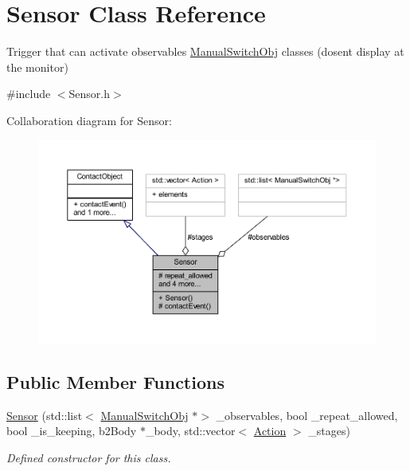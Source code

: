 \hypertarget{class_sensor}{}\section{Sensor Class Reference}
\label{class_sensor}


Trigger that can activate observables \hyperlink{class_manual_switch_obj}{Manual\+Switch\+Obj} classes (dosen\textquotesingle{}t display at the monitor)  




{\ttfamily \#include $<$Sensor.\+h$>$}



Collaboration diagram for Sensor\+:
\nopagebreak
\begin{figure}[H]
\begin{center}
\leavevmode
\includegraphics[width=350pt]{class_sensor__coll__graph}
\end{center}
\end{figure}
\subsection*{Public Member Functions}
\begin{DoxyCompactItemize}
\item 
\hyperlink{class_sensor_a7988853c8a9278171ce8956ccdde63c8}{Sensor} (std\+::list$<$ \hyperlink{class_manual_switch_obj}{Manual\+Switch\+Obj} $\ast$$>$ \+\_\+observables, bool \+\_\+repeat\+\_\+allowed, bool \+\_\+is\+\_\+keeping, b2\+Body $\ast$\+\_\+body, std\+::vector$<$ \hyperlink{_manual_switch_obj_8h_a8bb1ef53467e4f61410d12822d922498}{Action} $>$ \+\_\+stages)
\begin{DoxyCompactList}\small\item\em Defined constructor for this class. \end{DoxyCompactList}\end{DoxyCompactItemize}
